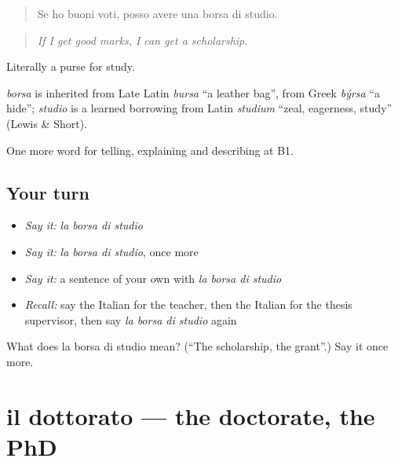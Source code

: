 \begin{quote}
Se ho buoni voti, posso avere una borsa di studio.
\end{quote}

\begin{quote}
\emph{If I get good marks, I can get a scholarship.}
\end{quote}

Literally a purse for study.

\begin{cousinweb}
\emph{borsa} is inherited from Late Latin \emph{bursa} \textquotedblleft{}a leather bag\textquotedblright{}, from Greek \emph{býrsa} \textquotedblleft{}a hide\textquotedblright{}; \emph{studio} is a learned borrowing from Latin \emph{studium} \textquotedblleft{}zeal, eagerness, study\textquotedblright{} (Lewis \& Short).
\end{cousinweb}

\begin{grammarlens}[title={What you've built}]
One more word for telling, explaining and describing at B1.
\end{grammarlens}

\subsection*{Your turn}
\begin{itemize}
\raggedright
  \item \emph{Say it:} \emph{la borsa di studio}
  \item \emph{Say it:} \emph{la borsa di studio}, once more
  \item \emph{Say it:} a sentence of your own with \emph{la borsa di studio}
  \item \emph{Recall:} say the Italian for the teacher, then the Italian for the thesis supervisor, then say \emph{la borsa di studio} again
\end{itemize}

\begin{tcolorbox}[breakable,colback=teal!4,colframe=teal!35!black,title={Before you move on}]
What does la borsa di studio mean? (\textquotedblleft{}The scholarship, the grant\textquotedblright{}.) Say it once more.
\end{tcolorbox}
\section[il dottorato]{il dottorato — the doctorate, the PhD}

